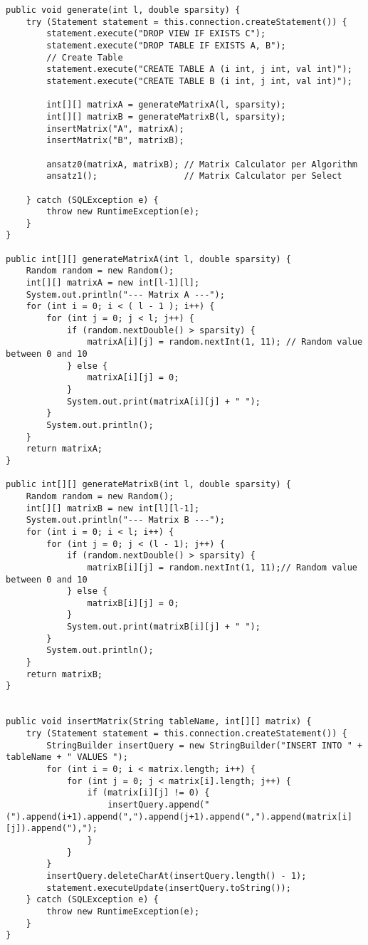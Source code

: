 \documentclass[11pt]{scrartcl}
\begin{document}
\begin{lstlisting}[style=dmrJava]
  public void generate(int l, double sparsity) {
    try (Statement statement = this.connection.createStatement()) {
        statement.execute("DROP VIEW IF EXISTS C");
        statement.execute("DROP TABLE IF EXISTS A, B");
        // Create Table
        statement.execute("CREATE TABLE A (i int, j int, val int)");
        statement.execute("CREATE TABLE B (i int, j int, val int)");

        int[][] matrixA = generateMatrixA(l, sparsity);
        int[][] matrixB = generateMatrixB(l, sparsity);
        insertMatrix("A", matrixA);
        insertMatrix("B", matrixB);

        ansatz0(matrixA, matrixB); // Matrix Calculator per Algorithm
        ansatz1();                 // Matrix Calculator per Select

    } catch (SQLException e) {
        throw new RuntimeException(e);
    }
}

public int[][] generateMatrixA(int l, double sparsity) {
    Random random = new Random();
    int[][] matrixA = new int[l-1][l];
    System.out.println("--- Matrix A ---");
    for (int i = 0; i < ( l - 1 ); i++) {
        for (int j = 0; j < l; j++) {
            if (random.nextDouble() > sparsity) {
                matrixA[i][j] = random.nextInt(1, 11); // Random value between 0 and 10
            } else {
                matrixA[i][j] = 0;
            }
            System.out.print(matrixA[i][j] + " ");
        }
        System.out.println();
    }
    return matrixA;
}

public int[][] generateMatrixB(int l, double sparsity) {
    Random random = new Random();
    int[][] matrixB = new int[l][l-1];
    System.out.println("--- Matrix B ---");
    for (int i = 0; i < l; i++) {
        for (int j = 0; j < (l - 1); j++) {
            if (random.nextDouble() > sparsity) {
                matrixB[i][j] = random.nextInt(1, 11);// Random value between 0 and 10
            } else {
                matrixB[i][j] = 0;
            }
            System.out.print(matrixB[i][j] + " ");
        }
        System.out.println();
    }
    return matrixB;
}


public void insertMatrix(String tableName, int[][] matrix) {
    try (Statement statement = this.connection.createStatement()) {
        StringBuilder insertQuery = new StringBuilder("INSERT INTO " + tableName + " VALUES ");
        for (int i = 0; i < matrix.length; i++) {
            for (int j = 0; j < matrix[i].length; j++) {
                if (matrix[i][j] != 0) {
                    insertQuery.append("(").append(i+1).append(",").append(j+1).append(",").append(matrix[i][j]).append("),");
                }
            }
        }
        insertQuery.deleteCharAt(insertQuery.length() - 1);
        statement.executeUpdate(insertQuery.toString());
    } catch (SQLException e) {
        throw new RuntimeException(e);
    }
}
\end{lstlisting}
\end{document}
